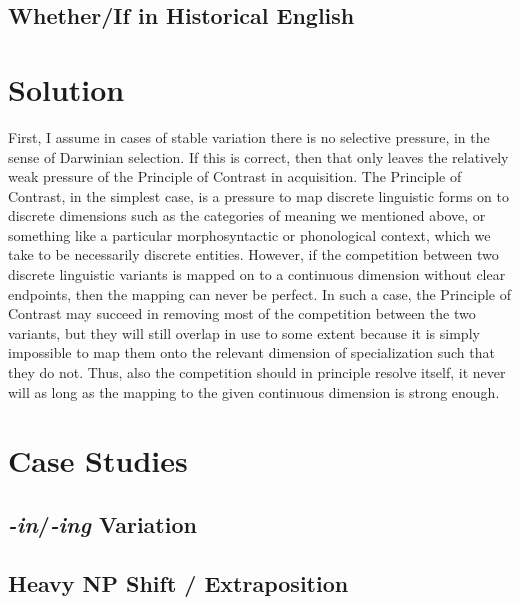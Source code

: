\subsection{Whether/If in Historical English}

\section{Solution}
\label{solution}

First, I assume in cases of stable variation there is no selective pressure, in the sense of Darwinian selection. If this is correct, then that only leaves the relatively weak pressure of the Principle of Contrast in acquisition.  
The Principle of Contrast, in the simplest case, is a pressure to map discrete linguistic forms on to discrete dimensions such as the categories of meaning we mentioned above, or something like a particular morphosyntactic or phonological context, which we take to be necessarily discrete entities. However, if the competition between two discrete linguistic variants is mapped on to a continuous dimension without clear endpoints, then the mapping can never be perfect. In such a case, the Principle of Contrast may succeed in removing most of the competition between the two variants, but they will still overlap in use to some extent because it is simply impossible to map them onto the relevant dimension of specialization such that they do not. Thus, also the competition should in principle resolve itself, it never will as long as the mapping to the given continuous dimension is strong enough.

\section{Case Studies}
\label{cases}

\subsection{\textsl{-in}/\textsl{-ing} Variation}

\subsection{Heavy NP Shift / Extraposition}

